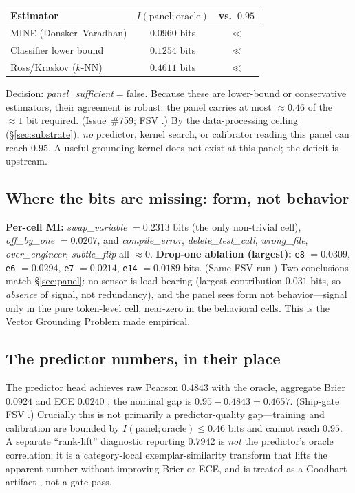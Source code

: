 \documentclass[10pt,twocolumn]{article}
\begin{document}
\begin{center}
\small
\begin{tabular}{@{}lcc@{}}
\toprule
Estimator & $I(\text{panel};\text{oracle})$ & vs.\ $0.95$\\
\midrule
MINE (Donsker--Varadhan) & $0.0960$ bits & $\ll$\\
Classifier lower bound & $0.1254$ bits & $\ll$\\
Ross/Kraskov ($k$-NN) & $0.4611$ bits & $\ll$\\
\bottomrule
\end{tabular}
\end{center}

Decision: \textit{panel\_sufficient}$=$false. Because these are lower-bound or
conservative estimators, their agreement is robust: the panel carries at most
$\approx0.46$ of the $\approx1$ bit required. (Issue~\#759; FSV
.)
By the data-processing ceiling (\S\ref{sec:substrate}), \emph{no} predictor,
kernel search, or calibrator reading this panel can reach $0.95$. A useful
grounding kernel does not exist at this panel; the deficit is upstream.

\subsection{Where the bits are missing: form, not behavior}
\textbf{Per-cell MI:} \textit{swap\_variable} $=0.2313$ bits (the only non-trivial
cell), \textit{off\_by\_one} $=0.0207$, and \textit{compile\_error},
\textit{delete\_test\_call}, \textit{wrong\_file}, \textit{over\_engineer},
\textit{subtle\_flip} all $\approx0$. \textbf{Drop-one ablation (largest):}
\texttt{e8} $=0.0309$, \texttt{e6} $=0.0294$, \texttt{e7} $=0.0214$, \texttt{e14}
$=0.0189$ bits. (Same FSV run.) Two conclusions match \S\ref{sec:panel}: no sensor
is load-bearing (largest contribution $0.031$ bits, so \emph{absence} of signal,
not redundancy), and the panel sees form not behavior---signal only in the pure
token-level cell, near-zero in the behavioral cells. This is the Vector Grounding
Problem \citep{mollo2023vector} made empirical.

\subsection{The predictor numbers, in their place}
The predictor head achieves raw Pearson $0.4843$ with the oracle, aggregate Brier
$0.0924$ and ECE $0.0240$ \citep{brier1950verification, guo2017calibration}; the
nominal gap is $0.95-0.4843=0.4657$. (Ship-gate FSV
.) Crucially this is not
primarily a predictor-quality gap---training and calibration are bounded by
$I(\text{panel};\text{oracle})\le0.46$ bits and cannot reach $0.95$. A separate
``rank-lift'' diagnostic reporting $0.7942$ is \emph{not} the predictor's oracle
correlation; it is a category-local exemplar-similarity transform that lifts the
apparent number without improving Brier or ECE, and is treated as a Goodhart
artifact \citep{manheim2018categorizing}, not a gate pass.
\end{document}
